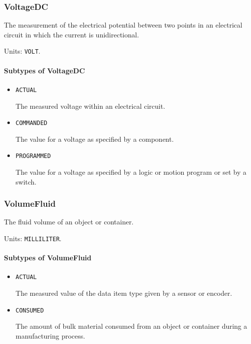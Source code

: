 \subsubsection{VoltageDC}
\label{sec:VoltageDC}



The measurement of the electrical potential between two points in an electrical circuit in which the current is unidirectional.


Units: \texttt{VOLT}.

\paragraph{Subtypes of VoltageDC}\mbox{}
\label{sec:Subtypes of VoltageDC}

\begin{itemize}

\item \texttt{ACTUAL}


The measured voltage within an electrical circuit.

\item \texttt{COMMANDED}


The value for a voltage as specified by a  component.

\item \texttt{PROGRAMMED}


The value for a voltage as specified by a logic or motion program or set by a switch.


\end{itemize}

\subsubsection{VolumeFluid}
\label{sec:VolumeFluid}



The fluid volume of an object or container.


Units: \texttt{MILLILITER}.

\paragraph{Subtypes of VolumeFluid}\mbox{}
\label{sec:Subtypes of VolumeFluid}

\begin{itemize}

\item \texttt{ACTUAL}


The measured value of the data item type given by a sensor or encoder.

\item \texttt{CONSUMED}


The amount of bulk material consumed from an object or container during a manufacturing process.


\end{itemize}

